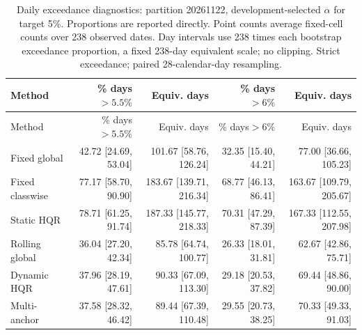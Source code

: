 \begingroup\small\setlength{\tabcolsep}{3pt}
\begin{longtable}{lrrrr}
\caption{Daily exceedance diagnostics: partition 20261122, development-selected $\alpha$ for target 5\%. Proportions are reported directly. Point counts average fixed-cell counts over 238 observed dates. Day intervals use 238 times each bootstrap exceedance proportion, a fixed 238-day equivalent scale; no clipping. Strict exceedance; paired 28-calendar-day resampling.}\label{tab:final-risk-1-1-exceed}\\
\toprule
Method & \% days$>5.5\%$ & Equiv. days & \% days$>6\%$ & Equiv. days\\
\midrule
\endfirsthead
\toprule
Method & \% days$>5.5\%$ & Equiv. days & \% days$>6\%$ & Equiv. days\\
\midrule
\endhead
Fixed global & 42.72 [24.69, 53.04] & 101.67 [58.76, 126.24] & 32.35 [15.40, 44.21] & 77.00 [36.66, 105.23]\\
Fixed classwise & 77.17 [58.70, 90.90] & 183.67 [139.71, 216.34] & 68.77 [46.13, 86.41] & 163.67 [109.79, 205.67]\\
Static HQR & 78.71 [61.25, 91.74] & 187.33 [145.77, 218.33] & 70.31 [47.29, 87.39] & 167.33 [112.55, 207.98]\\
Rolling global & 36.04 [27.20, 42.34] & 85.78 [64.74, 100.77] & 26.33 [18.01, 31.81] & 62.67 [42.86, 75.71]\\
Dynamic HQR & 37.96 [28.19, 47.61] & 90.33 [67.09, 113.30] & 29.18 [20.53, 37.82] & 69.44 [48.86, 90.00]\\
Multi-anchor & 37.58 [28.32, 46.42] & 89.44 [67.39, 110.48] & 29.55 [20.73, 38.25] & 70.33 [49.33, 91.03]\\
\bottomrule
\end{longtable}
\endgroup
